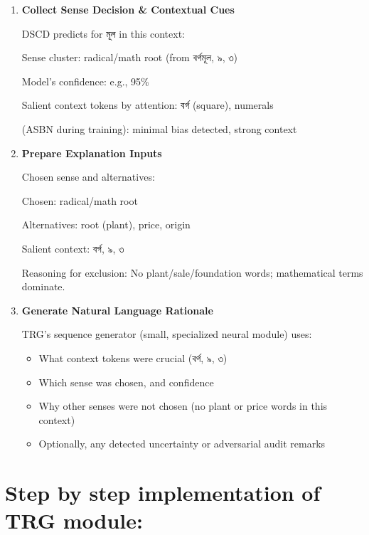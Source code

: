 \documentclass[a4paper,12pt]{article}
\begin{document}
\begin{enumerate}
    \item \textbf{Collect Sense Decision \& Contextual Cues}

    DSCD predicts for \textbengali{মূল} in this context:

    Sense cluster: radical/math root (from \textbengali{বর্গমূল}, \textbengali{৯}, \textbengali{৩})

    Model’s confidence: e.g., 95\%

    Salient context tokens by attention: \textbengali{বর্গ} (square), numerals

    (ASBN during training): minimal bias detected, strong context

    \item \textbf{Prepare Explanation Inputs}

    Chosen sense and alternatives:

    Chosen: radical/math root

    Alternatives: root (plant), price, origin

    Salient context: \textbengali{বর্গ}, \textbengali{৯}, \textbengali{৩}

    Reasoning for exclusion: No plant/sale/foundation words; mathematical terms dominate.

    \item \textbf{Generate Natural Language Rationale}

    TRG’s sequence generator (small, specialized neural module) uses:

    \begin{itemize}
        \item What context tokens were crucial (\textbengali{বর্গ}, \textbengali{৯}, \textbengali{৩})
        \item Which sense was chosen, and confidence
        \item Why other senses were not chosen (no plant or price words in this context)
        \item Optionally, any detected uncertainty or adversarial audit remarks
    \end{itemize}
\end{enumerate}

\bigskip

\section*{Step by step implementation of TRG module:}
\end{document}
